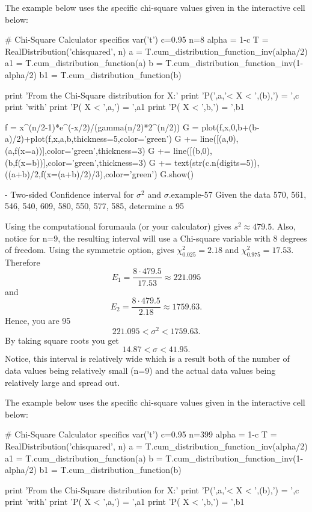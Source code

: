 \documentclass[10pt,]{book}
\numberwithin{equation}{section}
\newcommand{\lt}{<}
\begin{document}
The example below uses the specific chi-square values given in the interactive cell below: \leavevmode%
\begin{sageinput}
# Chi-Square Calculator specifics
var('t')
c=0.95
n=8
alpha = 1-c
T = RealDistribution('chisquared', n)
a = T.cum_distribution_function_inv(alpha/2)
a1 = T.cum_distribution_function(a)
b = T.cum_distribution_function_inv(1-alpha/2)
b1 = T.cum_distribution_function(b)

print 'From the Chi-Square distribution for X:'
print 'P(',a,'< X < ',(b),') = ',c
print 'with'
print 'P( X < ',a,') = ',a1
print 'P( X < ',b,') = ',b1

f = x^(n/2-1)*e^(-x/2)/(gamma(n/2)*2^(n/2))
G = plot(f,x,0,b+(b-a)/2)+plot(f,x,a,b,thickness=5,color='green')
G += line([(a,0),(a,f(x=a))],color='green',thickness=3)
G += line([(b,0),(b,f(x=b))],color='green',thickness=3)
G += text(str(c.n(digits=5)),((a+b)/2,f(x=(a+b)/2)/3),color='green')
G.show()
\end{sageinput}
 \begin{example}{- Two-sided Confidence interval for \(\sigma^2\) and \(\sigma\).}{example-57}%
\hypertarget{p-1404}{}%
Given the data 570, 561, 546, 540, 609, 580, 550, 577, 585, determine a 95%
\par
\hypertarget{p-1405}{}%
Using the computational forumaula (or your calculator) gives \(s^2 \approx 479.5\). Also, notice for n=9, the resulting interval will use a Chi-square variable with 8 degrees of freedom. Using the symmetric option, gives \(\chi_{0.025}^2 = 2.18\) and \(\chi_{0.975}^2 = 17.53\).  Therefore%
\begin{equation*}
E_1 = \frac{8 \cdot 479.5}{17.53} \approx 221.095
\end{equation*}
and%
\begin{equation*}
E_2 = \frac{8 \cdot 479.5}{2.18} \approx 1759.63.
\end{equation*}
Hence, you are 95%
\begin{equation*}
221.095 \lt \sigma^2 \lt 1759.63.
\end{equation*}
By taking square roots you get%
\begin{equation*}
14.87 \lt \sigma \lt 41.95.
\end{equation*}
Notice, this interval is relatively wide which is a result both of the number of data values being relatively small (n=9) and the actual data values being relatively large and spread out.%
\end{example}
 The example below uses the specific chi-square values given in the interactive cell below: \begin{sageinput}
# Chi-Square Calculator specifics
var('t')
c=0.95
n=399
alpha = 1-c
T = RealDistribution('chisquared', n)
a = T.cum_distribution_function_inv(alpha/2)
a1 = T.cum_distribution_function(a)
b = T.cum_distribution_function_inv(1-alpha/2)
b1 = T.cum_distribution_function(b)

print 'From the Chi-Square distribution for X:'
print 'P(',a,'< X < ',(b),') = ',c
print 'with'
print 'P( X < ',a,') = ',a1
print 'P( X < ',b,') = ',b1
\end{sageinput}
\end{document}
